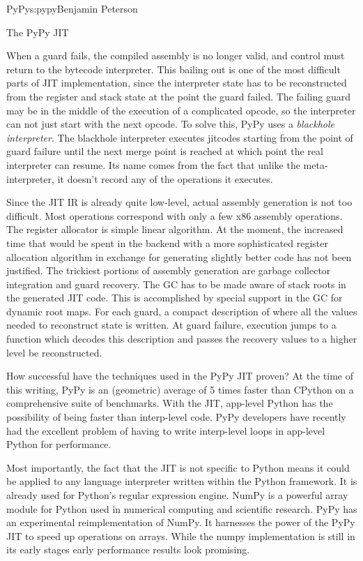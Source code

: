 \begin{aosachapter}{PyPy}{s:pypy}{Benjamin Peterson}
\begin{aosasect1}{The PyPy JIT}

When a guard fails, the compiled assembly is no longer valid, and control must
return to the bytecode interpreter. This bailing out is one of the most
difficult parts of JIT implementation, since the interpreter state has to be
reconstructed from the register and stack state at the point the guard
failed. The failing guard may be in the middle of the execution of a complicated
opcode, so the interpreter can not just start with the next opcode. To solve
this, PyPy uses a \emph{blackhole interpreter}. The blackhole interpreter
executes jitcodes starting from the point of guard failure until the next merge
point is reached at which point the real interpreter can resume. Its name comes
from the fact that unlike the meta-interpreter, it doesn't record any of the
operations it executes.

Since the JIT IR is already quite low-level, actual assembly generation is not
too difficult. Most operations correspond with only a few x86 assembly
operations. The register allocator is simple linear algorithm. At the moment,
the increased time that would be spent in the backend with a more sophisticated
register allocation algorithm in exchange for generating slightly better code
has not been justified. The trickiest portions of assembly generation are
garbage collector integration and guard recovery. The GC has to be made aware of
stack roots in the generated JIT code. This is accomplished by special support
in the GC for dynamic root maps. For each guard, a compact description of where
all the values needed to reconstruct state is written. At guard failure,
execution jumps to a function which decodes this description and passes the
recovery values to a higher level be reconstructed.

How successful have the techniques used in the PyPy JIT proven? At the time of
this writing, PyPy is an (geometric) average of 5 times faster than CPython on a
comprehensive suite of benchmarks. With the JIT, app-level Python has the
possibility of being faster than interp-level code. PyPy developers have
recently had the excellent problem of having to write interp-level loops in
app-level Python for performance.

Most importantly, the fact that the JIT is not specific to Python means it could
be applied to any language interpreter written within the Python framework. It
is already used for Python's regular expression engine. NumPy is a powerful
array module for Python used in numerical computing and scientific
research. PyPy has an experimental reimplementation of NumPy. It harnesses the
power of the PyPy JIT to speed up operations on arrays. While the numpy
implementation is still in its early stages early performance results look
promising.


\end{aosasect1}
\end{aosachapter}
